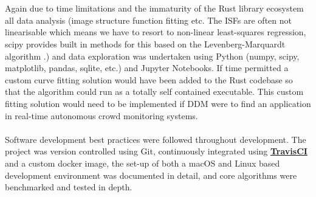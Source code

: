 \documentclass[11pt]{article}
\let\oldhref\href
\renewcommand{\href}[2]{\oldhref{#1}{\bfseries#2}}
\begin{document}
\\\\
Again due to time limitations and the immaturity of the Rust library ecosystem all data analysis (image structure function fitting etc. The ISFs are often not linearisable which means we have to resort to non-linear least-squares regression, scipy provides built in methods for this based on the Levenberg-Marquardt algorithm \cite{scipy_fit}.) and data exploration was undertaken using Python (numpy, scipy, matplotlib, pandas, sqlite, etc.) and Jupyter Notebooks. If time permitted a custom curve fitting solution would have been added to the Rust codebase so that the algorithm could run as a totally self contained executable. This custom fitting solution would need to be implemented if DDM were to find an application in real-time autonomous crowd monitoring systems.
\\\\
Software development best practices were followed throughout development. The project was version controlled using Git, continuously integrated using \href{https://travis-ci.com}{TravisCI} and a custom docker image, the set-up of both a macOS and Linux based development environment was documented in detail, and core algorithms were benchmarked and tested in depth.
\\\\
\end{document}
